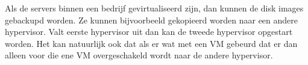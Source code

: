 Als de servers binnen een bedrijf gevirtualiseerd zijn, dan kunnen de disk images gebackupd worden. Ze kunnen bijvoorbeeld gekopieerd worden naar een andere hypervisor. Valt eerste hypervisor uit dan kan de tweede hypervisor opgestart worden. Het kan natuurlijk ook dat als er wat met een VM gebeurd dat er dan alleen voor die ene VM overgeschakeld wordt naar de andere hypervisor.


